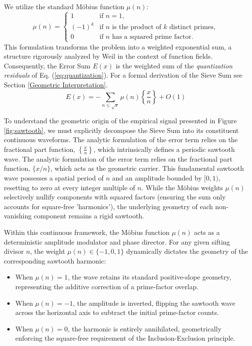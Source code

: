 \documentclass[sn-mathphys-num, pdflatex]{sn-jnl}
\begin{document}
We utilize the standard Möbius function $\mu(n)$:
\begin{equation}
\mu(n) =
\begin{cases}
1 & \text{if } n=1, \\
(-1)^k & \text{if } n \text{ is the product of } k \text{ distinct primes}, \\
0 & \text{if } n \text{ has a squared prime factor}.
\end{cases}
\end{equation}
This formulation transforms the problem into a weighted exponential sum, a structure rigorously analyzed by Weil \cite{weil} in the context of function fields. Consequently, the Error Sum $E(x)$ is the weighted sum of the \textit{quantization residuals} of Eq. (\ref{eq:quantization}). 
For a formal derivation of the Sieve Sum see Section \ref{Geometric Interpretation}.
\begin{equation}
\label{eq:mobius_sum}
E(x) = - \sum_{n \le \sqrt{x}} \mu(n) \left\{ \frac{x}{n} \right\} + O(1)
\end{equation}

To understand the geometric origin of the empirical signal presented in Figure \ref{fig:sawtooth}, we must explicitly decompose the Sieve Sum into its constituent continuous waveforms. The analytic formulation of the error term relies on the fractional part function, $\left\{ \frac{x}{n} \right\}$, which intrinsically defines a periodic sawtooth wave. The analytic formulation of the error term relies on the fractional part function, $\{x/n\}$, which acts as the geometric carrier. This fundamental sawtooth wave possesses a spatial period of $n$ and an amplitude bounded by $[0, 1)$, resetting to zero at every integer multiple of $n$. While the Möbius weights $\mu(n)$ selectively nullify components with squared factors (ensuring the sum only accounts for square-free 'harmonics'), the underlying geometry of each non-vanishing component remains a rigid sawtooth.

Within this continuous framework, the M\"obius function $\mu(n)$ acts as a deterministic amplitude modulator and phase director. For any given sifting divisor $n$, the weight $\mu(n) \in \{-1, 0, 1\}$ dynamically dictates the geometry of the corresponding sawtooth harmonic:
\begin{itemize}
    \item When $\mu(n) = 1$, the wave retains its standard positive-slope geometry, representing the additive correction of a prime-factor overlap.
    \item When $\mu(n) = -1$, the amplitude is inverted, flipping the sawtooth wave across the horizontal axis to subtract the initial prime-factor counts.
    \item When $\mu(n) = 0$, the harmonic is entirely annihilated, geometrically enforcing the square-free requirement of the Inclusion-Exclusion principle.
\end{itemize}
\end{document}
